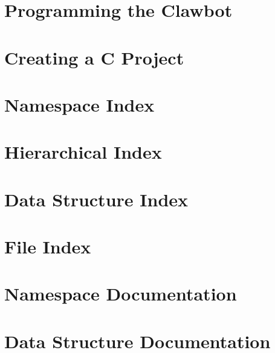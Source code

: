 \let\mypdfximage\pdfximage\def\pdfximage{\immediate\mypdfximage}\documentclass[twoside]{book}
\newcommand{\+}{\discretionary{\mbox{\scriptsize$\hookleftarrow$}}{}{}}
\begin{document}
\chapter{Programming the Clawbot}
\label{md_docs_tutorials_walkthrough_clawbot}

\chapter{Creating a C Project}
\label{md_docs_tutorials_walkthrough_creating-c-project}

\chapter{Namespace Index}

\chapter{Hierarchical Index}

\chapter{Data Structure Index}

\chapter{File Index}

\chapter{Namespace Documentation}






\chapter{Data Structure Documentation}




















\end{document}
